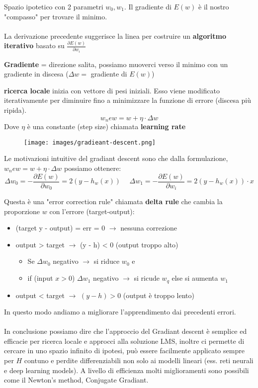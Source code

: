 \hspace{-15pt}Spazio ipotetico con 2 parametri $w_0, w_1$. Il gradiente di $E(w)$ è il nostro "compasso" per trovare il minimo.\\\\
La derivazione precedente suggerisce la linea per costruire un \textbf{algoritmo iterativo} basato su $\frac{\partial E(w)}{\partial w_i}$
\begin{definition}
    \textbf{Gradiente} = direzione salita, possiamo muoverci verso il minimo con un gradiente in discesa ($\Delta w =$ gradiente di $E(w)$)
\end{definition}
\begin{definition}
    \textbf{ricerca locale} inizia con vettore di pesi iniziali. Esso viene modificato iterativamente per diminuire
    fino a minimizzare la funzione di errore (discesa più ripida).
    $$w_new = w + \eta \cdot \Delta w$$
    Dove $\eta$ è una constante (step size) chiamata \textbf{learning rate}
\end{definition}
\begin{figure}[h!]
    \centering
    \texttt{[image: images/gradieant-descent.png]}
\end{figure}
Le motivazioni intuitive del gradiant descent sono che dalla formulazione, $w_new = w + \eta \cdot \Delta w$ possiamo ottenere:
$$\Delta w_0 = -\frac{\partial E(w)}{\partial w_0} = 2(y- h_w(x)) \hspace{15pt} \Delta w_1 = -\frac{\partial E(w)}{\partial w_i} = 2(y - h_w(x)) \cdot x$$
\begin{definition}
    Questa è una "error correction rule" chiamata \textbf{delta rule} che cambia la proporzione $w$ con l'errore (target-output):
    \begin{itemize}
        \item (target y - output) = err  = 0 $\to$ nessuna correzione 
        \item output > target $\to$ (y - h) < 0 (output troppo alto)
        \begin{itemize}
            \item Se $\Delta w_0$ negativo $\to$ si riduce $w_0$ e 
            \item if (input $x > 0$) $\Delta w_1$ negativo $\to$ si ricude $w_q$ else si aumenta $w_1$
        \end{itemize}
        \item output < target $\to$ $(y - h) > 0$ (output è troppo lento)
    \end{itemize} 
\end{definition}
\hspace{-15pt}In questo modo andiamo a migliorare l'apprendimento dai precedenti errori.\\\\
In conclusione possiamo dire che l'approccio del Gradiant descent è semplice ed efficacie per ricerca locale e approcci alla soluzione LMS, inoltre
ci permette di cercare in uno spazio infinito di ipotesi, può essere facilmente applicato sempre per $H$ contuno e perdite differenziabili non solo ai modelli lineari
(ess. reti neurali e deep learning models). A livello di efficienza molti miglioramenti sono possibili come il Newton's method, Conjugate Gradiant.

